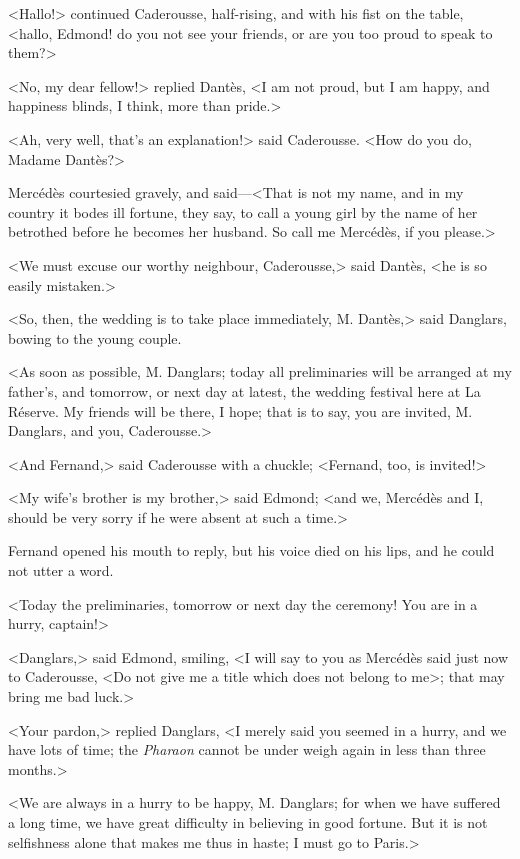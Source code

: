  <Hallo!> continued Caderousse, half-rising, and with his fist on the table, <hallo, Edmond! do you not see your friends, or are you too proud to speak to them?> 

 <No, my dear fellow!> replied Dantès, <I am not proud, but I am happy, and happiness blinds, I think, more than pride.> 

 <Ah, very well, that's an explanation!> said Caderousse. <How do you do, Madame Dantès?> 

 Mercédès courtesied gravely, and said—<That is not my name, and in my country it bodes ill fortune, they say, to call a young girl by the name of her betrothed before he becomes her husband. So call me Mercédès, if you please.> 

 <We must excuse our worthy neighbour, Caderousse,> said Dantès, <he is so easily mistaken.> 

 <So, then, the wedding is to take place immediately, M. Dantès,> said Danglars, bowing to the young couple. 

 <As soon as possible, M. Danglars; today all preliminaries will be arranged at my father's, and tomorrow, or next day at latest, the wedding festival here at La Réserve. My friends will be there, I hope; that is to say, you are invited, M. Danglars, and you, Caderousse.> 

 <And Fernand,> said Caderousse with a chuckle; <Fernand, too, is invited!> 

 <My wife's brother is my brother,> said Edmond; <and we, Mercédès and I\@, should be very sorry if he were absent at such a time.> 

 Fernand opened his mouth to reply, but his voice died on his lips, and he could not utter a word. 

 <Today the preliminaries, tomorrow or next day the ceremony! You are in a hurry, captain!> 

 <Danglars,> said Edmond, smiling, <I will say to you as Mercédès said just now to Caderousse, <Do not give me a title which does not belong to me>; that may bring me bad luck.> 

 <Your pardon,> replied Danglars, <I merely said you seemed in a hurry, and we have lots of time; the \textit{Pharaon} cannot be under weigh again in less than three months.> 

 <We are always in a hurry to be happy, M. Danglars; for when we have suffered a long time, we have great difficulty in believing in good fortune. But it is not selfishness alone that makes me thus in haste; I must go to Paris.> 

